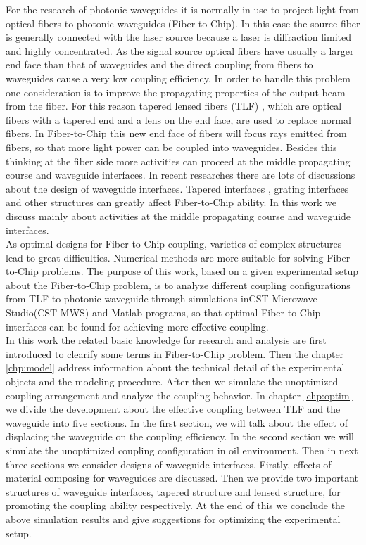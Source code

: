For the research of photonic waveguides it is normally in use to project light from optical fibers to photonic waveguides (Fiber-to-Chip). In this case the source fiber is generally connected with the laser source because a laser is diffraction limited and highly concentrated. As the signal source optical fibers have usually a larger end face than that of waveguides and the direct coupling from fibers to waveguides cause a very low coupling efficiency. In order to handle this problem one consideration is to improve the propagating properties of the output beam from the fiber. For this reason tapered lensed fibers (TLF) \cite{TLF_mode_transforming,TLF_analysis}, which are optical fibers with a tapered end and a lens on the end face, are used to replace normal fibers. In Fiber-to-Chip this new end face of fibers will focus rays emitted from fibers, so that more light power can be coupled into waveguides. Besides this thinking at the fiber side more activities can proceed at the middle propagating course and waveguide interfaces. In recent researches there are lots of discussions about the design of waveguide interfaces. Tapered interfaces \cite{design_fabrication_tapered_waveguide}, grating interfaces \cite{fiber_to_chip_grating_waveguides} and other structures can greatly affect Fiber-to-Chip ability. In this work we discuss mainly about activities at the middle propagating course and waveguide interfaces.\\ 

As optimal designs for Fiber-to-Chip coupling, varieties of complex structures lead to great difficulties. Numerical methods are more suitable for solving Fiber-to-Chip problems. The purpose of this work, based on a given experimental setup about the Fiber-to-Chip problem, is to analyze different coupling configurations from TLF to photonic waveguide through simulations inCST Microwave Studio\textregistered (CST MWS) and Matlab programs, so that optimal Fiber-to-Chip interfaces can be found for achieving more effective coupling.\\

In this work the related basic knowledge for research and analysis are first introduced to clearify some terms in Fiber-to-Chip problem. Then the chapter \ref{chp:model} address information about the technical detail of the experimental objects and the modeling procedure. After then we simulate the unoptimized coupling arrangement and analyze the coupling behavior. In chapter \ref{chp:optim} we divide the development about the effective coupling between TLF and the waveguide into five sections. In the first section, we will talk about the effect of displacing the waveguide on the coupling efficiency. In the second section we will simulate the unoptimized coupling configuration in oil environment. Then in next three sections we consider designs of waveguide interfaces. Firstly, effects of material composing for waveguides are discussed. Then we provide two important structures of waveguide interfaces, tapered structure and lensed structure, for promoting the coupling ability respectively. At the end of this we conclude the above simulation results and give suggestions for optimizing the experimental setup.\\ 

